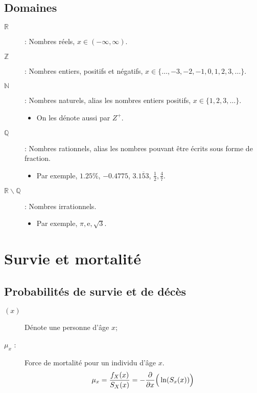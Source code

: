 \documentclass[10pt, french]{article}
\begin{document}
\begin{multicols*}{3}
\subsection*{Domaines}
\begin{definitionNOHFILL}[Domaines]
\begin{description}
	\item[$\mathds{R}$]: Nombres réels, $x \in (-\infty, \infty)$.
	\item[$\mathds{Z}$]: Nombres entiers, positifs et négatifs, $x \in \{\dots, -3, -2, -1, 0, 1, 2, 3, \dots\}$.
	\item[$\mathds{N}$]: Nombres naturels, alias les nombres entiers positifs, $x \in \{1, 2, 3, \dots\}$.
		\begin{itemize}
		\item	On les dénote aussi par $Z^{+}$.
		\end{itemize}
	\item[$\mathds{Q}$]: Nombres rationnels, alias les nombres pouvant être écrits sous forme de fraction.
		\begin{itemize}
		\item	Par exemple, $1.25\%$, $-0.4775$, $3.\overline{153}$, $\frac{1}{2}, \frac{4}{7}$.
		\end{itemize}			
	\item[$\mathds{R} \backslash \mathds{Q}$]: Nombres irrationnels.
		\begin{itemize}
		\item	Par exemple, $\pi, \mathrm{e}, \sqrt{3}$.
		\end{itemize}
\end{description}
\end{definitionNOHFILL}




\newpage
\section{Survie et mortalité}
\setcounter{subsection}{1}
\subsection{Probabilités de survie et de décès}
\begin{description}
	\item[$(x)$]	Dénote une personne d'âge $x$;
	\item[$\mu_{x}$ : ] Force de mortalité pour un individu d'âge $x$.
		\begin{align*}
		\mu_{x}
		&=	\frac{f_{X}(x)}{S_X(x)} 
		=	-\frac{\partial}{\partial x} \Big( \ln(S_{x}(x))\Big)	\\
		\end{align*}
\end{description}



\end{multicols*}
\end{document}
